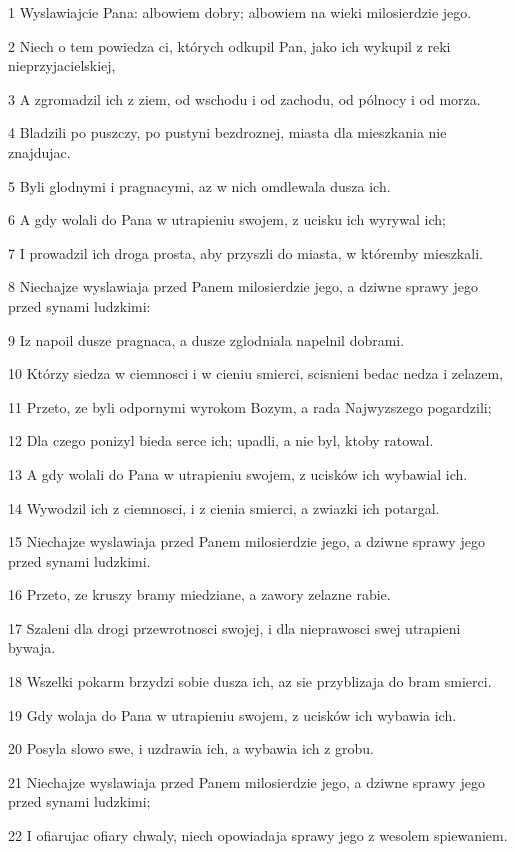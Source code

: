 \par 1 Wyslawiajcie Pana: albowiem dobry; albowiem na wieki milosierdzie jego.
\par 2 Niech o tem powiedza ci, których odkupil Pan, jako ich wykupil z reki nieprzyjacielskiej,
\par 3 A zgromadzil ich z ziem, od wschodu i od zachodu, od pólnocy i od morza.
\par 4 Bladzili po puszczy, po pustyni bezdroznej, miasta dla mieszkania nie znajdujac.
\par 5 Byli glodnymi i pragnacymi, az w nich omdlewala dusza ich.
\par 6 A gdy wolali do Pana w utrapieniu swojem, z ucisku ich wyrywal ich;
\par 7 I prowadzil ich droga prosta, aby przyszli do miasta, w któremby mieszkali.
\par 8 Niechajze wyslawiaja przed Panem milosierdzie jego, a dziwne sprawy jego przed synami ludzkimi:
\par 9 Iz napoil dusze pragnaca, a dusze zglodniala napelnil dobrami.
\par 10 Którzy siedza w ciemnosci i w cieniu smierci, scisnieni bedac nedza i zelazem,
\par 11 Przeto, ze byli odpornymi wyrokom Bozym, a rada Najwyzszego pogardzili;
\par 12 Dla czego ponizyl bieda serce ich; upadli, a nie byl, ktoby ratowal.
\par 13 A gdy wolali do Pana w utrapieniu swojem, z ucisków ich wybawial ich.
\par 14 Wywodzil ich z ciemnosci, i z cienia smierci, a zwiazki ich potargal.
\par 15 Niechajze wyslawiaja przed Panem milosierdzie jego, a dziwne sprawy jego przed synami ludzkimi.
\par 16 Przeto, ze kruszy bramy miedziane, a zawory zelazne rabie.
\par 17 Szaleni dla drogi przewrotnosci swojej, i dla nieprawosci swej utrapieni bywaja.
\par 18 Wszelki pokarm brzydzi sobie dusza ich, az sie przyblizaja do bram smierci.
\par 19 Gdy wolaja do Pana w utrapieniu swojem, z ucisków ich wybawia ich.
\par 20 Posyla slowo swe, i uzdrawia ich, a wybawia ich z grobu.
\par 21 Niechajze wyslawiaja przed Panem milosierdzie jego, a dziwne sprawy jego przed synami ludzkimi;
\par 22 I ofiarujac ofiary chwaly, niech opowiadaja sprawy jego z wesolem spiewaniem.
